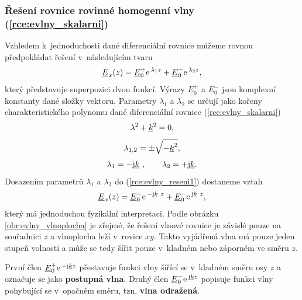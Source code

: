 \subsubsection*{Řešení rovnice rovinné homogenní vlny (\ref{rce:evlny_skalarni})}
Vzhledem k~jednoduchosti dané diferenciální rovnice můžeme rovnou předpokládat řešení v~následujícím tvaru
\begin{equation}
	{\underline{E}}_{x}(z) = {\underline{E}}_{0}^{+}\mathrm{e\,}^{\lambda_{1}z} +{\underline{E}}_{0}^{-}\mathrm{e\,}^{\lambda_{2}z},
	\label{rce:evlny_reseni1}	
\end{equation}
který představuje superpozici dvou funkcí. Výrazy $E_{0}^{+}$ a $E_{0}^{-}$ jsou komplexní konstanty dané složky vektoru. Parametry $\lambda_{1}$ a $\lambda_{2}$ se určují jako kořeny charakteristického polynomu dané diferenciální rovnice (\ref{rce:evlny_skalarni})
\begin{displaymath}
	\lambda^{2} + {\underline{k}}^{2}= 0,
\end{displaymath}
\begin{displaymath}
	\lambda_{1,2} = \pm \sqrt{-{\underline{k}}^{2}},
\end{displaymath}
\begin{displaymath}
	\lambda_{1} = -\mathrm{j}{\underline{k}}~,\qquad \lambda_{2} = +\mathrm{j}{\underline{k}}.
\end{displaymath}
Dosazením parametrů $\lambda_{1}$ a $\lambda_{2}$ do (\ref{rce:evlny_reseni1}) dostaneme vztah 
\begin{equation}
	{\underline{E}}_{x}(z) = {\underline{E}}_{0}^{+}\mathrm{e\,}^{-\mathrm{j}{\underline{k}}~z} + {\underline{E}}_{0}^{-}\mathrm{e\,}^{\mathrm{j}{\underline{k}}~z},
	\label{rce:evlny_reseni2}	
\end{equation}
který má jednoduchou fyzikální interpretaci. Podle obrázku \ref{obr:evlny_vlnoplocha} je zřejmé, že řešení vlnové rovnice je závislé pouze na souřadnici $z$ a vlnoplocha leží v~rovice $xy$. Takto vyjádřená vlna má pouze jeden stupeň volnosti a může se tedy šířit pouze v~kladném nebo záporném ve směru $z$.

První člen $ {\underline{E}}_{0}^{+}\mathrm{e\,}^{-\mathrm{j}{\underline{k}} z}$ přestavuje funkci vlny šířící se v~kladném směru osy $z$ a označuje se jako {\bf postupná vlna}. Druhý člen ${\underline{E}}_{0}^{-}\mathrm{e\,}^{\mathrm{j}{\underline{k}} z}$ popisuje funkci vlny pohybující se v~opačném směru, tzn. {\bf vlna odražená}.

